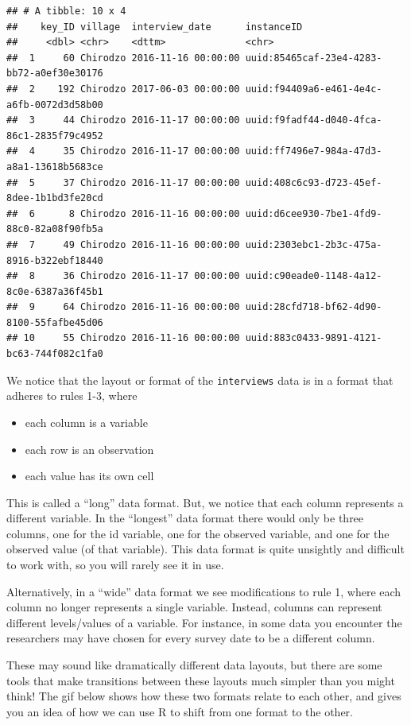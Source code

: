 \documentclass[
]{article}
\providecommand{\tightlist}{%
  \setlength{\itemsep}{0pt}\setlength{\parskip}{0pt}}
\begin{document}
\begin{verbatim}
## # A tibble: 10 x 4
##    key_ID village  interview_date      instanceID                               
##     <dbl> <chr>    <dttm>              <chr>                                    
##  1     60 Chirodzo 2016-11-16 00:00:00 uuid:85465caf-23e4-4283-bb72-a0ef30e30176
##  2    192 Chirodzo 2017-06-03 00:00:00 uuid:f94409a6-e461-4e4c-a6fb-0072d3d58b00
##  3     44 Chirodzo 2016-11-17 00:00:00 uuid:f9fadf44-d040-4fca-86c1-2835f79c4952
##  4     35 Chirodzo 2016-11-17 00:00:00 uuid:ff7496e7-984a-47d3-a8a1-13618b5683ce
##  5     37 Chirodzo 2016-11-17 00:00:00 uuid:408c6c93-d723-45ef-8dee-1b1bd3fe20cd
##  6      8 Chirodzo 2016-11-16 00:00:00 uuid:d6cee930-7be1-4fd9-88c0-82a08f90fb5a
##  7     49 Chirodzo 2016-11-16 00:00:00 uuid:2303ebc1-2b3c-475a-8916-b322ebf18440
##  8     36 Chirodzo 2016-11-17 00:00:00 uuid:c90eade0-1148-4a12-8c0e-6387a36f45b1
##  9     64 Chirodzo 2016-11-16 00:00:00 uuid:28cfd718-bf62-4d90-8100-55fafbe45d06
## 10     55 Chirodzo 2016-11-16 00:00:00 uuid:883c0433-9891-4121-bc63-744f082c1fa0
\end{verbatim}

We notice that the layout or format of the \texttt{interviews} data is
in a format that adheres to rules 1-3, where

\begin{itemize}
\tightlist
\item
  each column is a variable
\item
  each row is an observation
\item
  each value has its own cell
\end{itemize}

This is called a ``long'' data format. But, we notice that each column
represents a different variable. In the ``longest'' data format there
would only be three columns, one for the id variable, one for the
observed variable, and one for the observed value (of that variable).
This data format is quite unsightly and difficult to work with, so you
will rarely see it in use.

Alternatively, in a ``wide'' data format we see modifications to rule 1,
where each column no longer represents a single variable. Instead,
columns can represent different levels/values of a variable. For
instance, in some data you encounter the researchers may have chosen for
every survey date to be a different column.

These may sound like dramatically different data layouts, but there are
some tools that make transitions between these layouts much simpler than
you might think! The gif below shows how these two formats relate to
each other, and gives you an idea of how we can use R to shift from one
format to the other.
\end{document}
